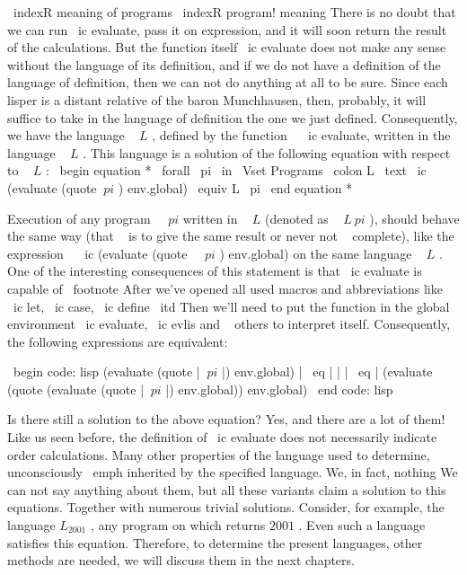 {{\ indexR {meaning of programs}
\ indexR {program! meaning}
There is no doubt that we can run \ ic {evaluate}, pass it on
expression, and it will soon return the result of the calculations. But the function itself
\ ic {evaluate} does not make any sense without the language of its definition, and if
we do not have a definition of the language of definition, then we can not do anything at all
to be sure. Since each lisper is a distant relative of the baron
Munchhausen, then, probably, it will suffice to take in the language of definition
the one we just defined. Consequently, we have the language ~ $ L $ ,
defined by the function ~ \ ic {evaluate}, written in the language ~ $ L $ . This language
is a solution of the following equation with respect to ~ $ L $ :
%
\ begin {equation *}
  \ forall \ pi  \ in  \ Vset {Programs} \ colon
    L \ text { \ ic {(evaluate (quote $ \ pi $ ) env.global)}} \ equiv L \ pi
\ end {equation *}

Execution of any program ~ $ \ pi $ written in ~ $ L $ (denoted as ~ $ L \ pi $ ),
should behave the same way (that ~ is to give the same result or never
not ~ complete), like the expression ~ \ ic {(evaluate (quote ~ $ \ pi $ ) env.global)} on
the same language ~ $ L $ . One of the interesting consequences of this statement is
that \ ic {evaluate} is capable of \ footnote {After we've opened all
used macros and abbreviations like \ ic {let}, \ ic {case}, \ ic {define}
{ \ itd } Then we'll need to put the function in the global environment
\ ic {evaluate}, \ ic {evlis} and ~ others} to interpret itself. Consequently,
the following expressions are equivalent:

\ begin {code: lisp}
(evaluate (quote | $ \ pi $ |) env.global) | \ eq |
  | | \ eq | (evaluate (quote (evaluate (quote | $ \ pi $ |) env.global)) env.global)
\ end {code: lisp}

Is there still a solution to the above equation? Yes, and there are a lot of them! Like us
seen before, the definition of \ ic {evaluate} does not necessarily indicate order
calculations. Many other properties of the language used to determine,
unconsciously \ emph {inherited} by the specified language. We, in fact, nothing
We can not say anything about them, but all these variants claim a solution to this
equations. Together with numerous trivial solutions. Consider,
for example, the language $ L_ {2001} $ , any program on which returns $ 2001 $ . Even
such a language satisfies this equation. Therefore, to determine the present
languages, other methods are needed, we will discuss them in the next chapters.


}}
